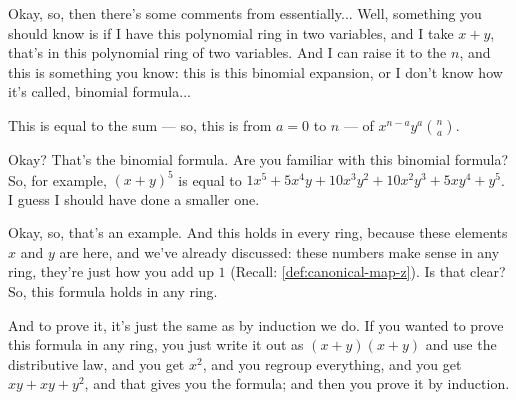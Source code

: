 \begin{speech}[00:01:55 - 00:03:48]
Okay, so, then there's some comments from essentially... Well, something you should know is if I have this polynomial ring in two variables,  and I take $x + y$, that's in this polynomial ring of two variables. And I can raise it to the $n$,  and this is something you know: this is this binomial expansion, or I don't know how it's called, binomial formula... 

This is equal to the sum --- so, this is from $a = 0$ to $n$ ---  of $x^{n-a} y^a \binom{n}{a}$. 

Okay? That's the binomial formula. Are you familiar with this binomial formula? So, for example, $(x+y)^5$  is equal to $1 x^5 + 5 x^4 y + 10 x^3 y^2 + 10 x^2 y^3 + 5 x y^4 + y^5$.  I guess I should have done a smaller one. 

Okay, so, that's an example. And this holds in every ring, because these elements $x$ and $y$ are here, and we've already discussed: these numbers make sense in any ring, they're just how you add up $1$ (Recall: \cref{def:canonical-map-z}). Is that clear? So, this formula holds in any ring. 

And to prove it, it's just the same as by induction we do. If you wanted to prove this formula in any ring, you just write it out as $(x+y)(x+y)$ and use the distributive law, and you get $x^2$, and you regroup everything, and you get $xy + xy + y^2$, and that gives you the formula; and then you prove it by induction. 
\end{speech}

